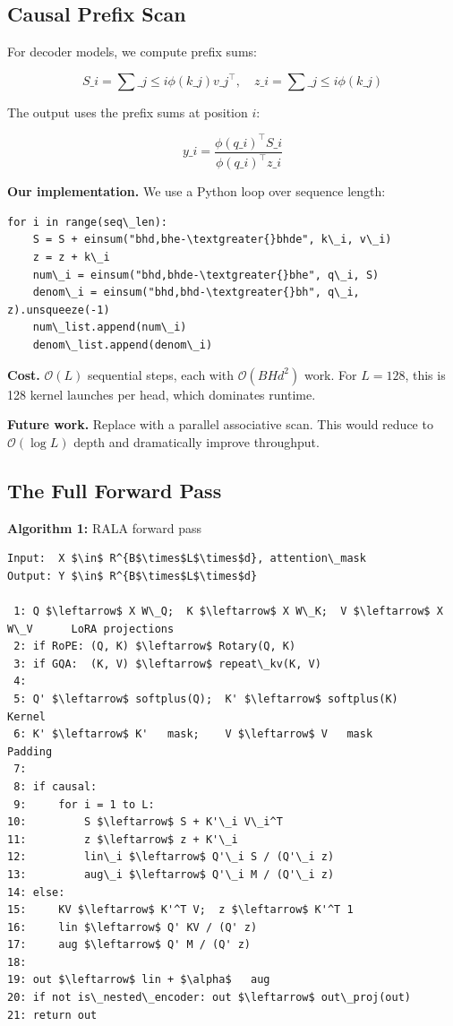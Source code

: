 \subsection{Causal Prefix Scan}

For decoder models, we compute prefix sums:

\[
S\_i = \sum\_{j \le i} \phi(k\_j) v\_j^\top, \quad
z\_i = \sum\_{j \le i} \phi(k\_j)
\tag{4.6}
\]

The output uses the prefix sums at position $i$:

\[
y\_i = \frac{\phi(q\_i)^\top S\_i}{\phi(q\_i)^\top z\_i}
\tag{4.7}
\]

\textbf{Our implementation.} We use a Python loop over sequence length:

\begin{lstlisting}
for i in range(seq\_len):
    S = S + einsum("bhd,bhe-\textgreater{}bhde", k\_i, v\_i)
    z = z + k\_i
    num\_i = einsum("bhd,bhde-\textgreater{}bhe", q\_i, S)
    denom\_i = einsum("bhd,bhd-\textgreater{}bh", q\_i, z).unsqueeze(-1)
    num\_list.append(num\_i)
    denom\_list.append(denom\_i)
\end{lstlisting}

\textbf{Cost.} $\mathcal{O}(L)$ sequential steps, each with $\mathcal{O}(BH d^2)$ 
work. For $L = 128$, this is 128 kernel launches per head, which dominates 
runtime.

\textbf{Future work.} Replace with a parallel associative scan. This would reduce 
to $\mathcal{O}(\log L)$ depth and dramatically improve throughput.

\subsection{The Full Forward Pass}

\textbf{Algorithm 1:} RALA forward pass
\begin{lstlisting}
Input:  X $\in$ R^{B$\times$L$\times$d}, attention\_mask
Output: Y $\in$ R^{B$\times$L$\times$d}

 1: Q $\leftarrow$ X W\_Q;  K $\leftarrow$ X W\_K;  V $\leftarrow$ X W\_V      LoRA projections
 2: if RoPE: (Q, K) $\leftarrow$ Rotary(Q, K)
 3: if GQA:  (K, V) $\leftarrow$ repeat\_kv(K, V)
 4:
 5: Q' $\leftarrow$ softplus(Q);  K' $\leftarrow$ softplus(K)     Kernel
 6: K' $\leftarrow$ K'   mask;    V $\leftarrow$ V   mask         Padding
 7:
 8: if causal:
 9:     for i = 1 to L:
10:         S $\leftarrow$ S + K'\_i V\_i^T
11:         z $\leftarrow$ z + K'\_i
12:         lin\_i $\leftarrow$ Q'\_i S / (Q'\_i z)
13:         aug\_i $\leftarrow$ Q'\_i M / (Q'\_i z)
14: else:
15:     KV $\leftarrow$ K'^T V;  z $\leftarrow$ K'^T 1
16:     lin $\leftarrow$ Q' KV / (Q' z)
17:     aug $\leftarrow$ Q' M / (Q' z)
18:
19: out $\leftarrow$ lin + $\alpha$   aug
20: if not is\_nested\_encoder: out $\leftarrow$ out\_proj(out)
21: return out
\end{lstlisting}

